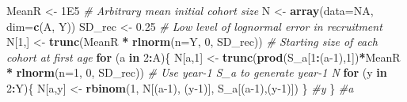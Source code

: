 \documentclass[
]{krantz}
\makeatletter
\newenvironment{Shaded}{\begin{snugshade}}{\end{snugshade}}
\newcommand{\AttributeTok}[1]{\textcolor[rgb]{0.27,0.27,0.27}{#1}}
\newcommand{\CommentTok}[1]{\textcolor[rgb]{0.37,0.37,0.37}{\textit{#1}}}
\newcommand{\ConstantTok}[1]{\textcolor[rgb]{0.37,0.37,0.37}{#1}}
\newcommand{\ControlFlowTok}[1]{\textcolor[rgb]{0.27,0.27,0.27}{\textbf{#1}}}
\newcommand{\DecValTok}[1]{\textcolor[rgb]{0.06,0.06,0.06}{#1}}
\newcommand{\FloatTok}[1]{\textcolor[rgb]{0.06,0.06,0.06}{#1}}
\newcommand{\FunctionTok}[1]{\textcolor[rgb]{0.27,0.27,0.27}{\textbf{#1}}}
\newcommand{\NormalTok}[1]{#1}
\newcommand{\OtherTok}[1]{\textcolor[rgb]{0.37,0.37,0.37}{#1}}
\newcommand{\SpecialCharTok}[1]{\textcolor[rgb]{0.43,0.43,0.43}{\textbf{#1}}}
\newenvironment{kframe}{%
\medskip{}
\setlength{\fboxsep}{.8em}
 \def\at@end@of@kframe{}%
 \ifinner\ifhmode%
  \def\at@end@of@kframe{\end{minipage}}%
  \begin{minipage}{\columnwidth}%
 \fi\fi%
 \def\FrameCommand##1{\hskip\@totalleftmargin \hskip-\fboxsep
 \colorbox{shadecolor}{##1}\hskip-\fboxsep
     \hskip-\linewidth \hskip-\@totalleftmargin \hskip\columnwidth}%
 \MakeFramed {\advance\hsize-\width
   \@totalleftmargin\z@ \linewidth\hsize
   \@setminipage}}%
 {\par\unskip\endMakeFramed%
 \at@end@of@kframe}
\renewenvironment{Shaded}{\begin{kframe}}{\end{kframe}}
\makeatother
\begin{document}
\begin{Shaded}
\begin{Highlighting}[]
\NormalTok{MeanR }\OtherTok{\textless{}{-}} \FloatTok{1E5} \CommentTok{\# Arbitrary mean initial cohort size}
\NormalTok{N }\OtherTok{\textless{}{-}} \FunctionTok{array}\NormalTok{(}\AttributeTok{data=}\ConstantTok{NA}\NormalTok{, }\AttributeTok{dim=}\FunctionTok{c}\NormalTok{(A, Y))}
\NormalTok{SD\_rec }\OtherTok{\textless{}{-}} \FloatTok{0.25} \CommentTok{\# Low level of lognormal error in recruitment}
\NormalTok{N[}\DecValTok{1}\NormalTok{,] }\OtherTok{\textless{}{-}} \FunctionTok{trunc}\NormalTok{(MeanR }\SpecialCharTok{*} \FunctionTok{rlnorm}\NormalTok{(}\AttributeTok{n=}\NormalTok{Y, }\DecValTok{0}\NormalTok{, SD\_rec)) }
\CommentTok{\# Starting size of each cohort at first age}
\ControlFlowTok{for}\NormalTok{ (a }\ControlFlowTok{in} \DecValTok{2}\SpecialCharTok{:}\NormalTok{A)\{}
\NormalTok{  N[a,}\DecValTok{1}\NormalTok{] }\OtherTok{\textless{}{-}} \FunctionTok{trunc}\NormalTok{(}\FunctionTok{prod}\NormalTok{(S\_a[}\DecValTok{1}\SpecialCharTok{:}\NormalTok{(a}\DecValTok{{-}1}\NormalTok{),}\DecValTok{1}\NormalTok{])}\SpecialCharTok{*}\NormalTok{MeanR }\SpecialCharTok{*} \FunctionTok{rlnorm}\NormalTok{(}\AttributeTok{n=}\DecValTok{1}\NormalTok{, }\DecValTok{0}\NormalTok{, SD\_rec))}
  \CommentTok{\# Use year{-}1 S\_a to generate year{-}1 N}
  \ControlFlowTok{for}\NormalTok{ (y }\ControlFlowTok{in} \DecValTok{2}\SpecialCharTok{:}\NormalTok{Y)\{}
\NormalTok{    N[a,y] }\OtherTok{\textless{}{-}} \FunctionTok{rbinom}\NormalTok{(}\DecValTok{1}\NormalTok{, N[(a}\DecValTok{{-}1}\NormalTok{), (y}\DecValTok{{-}1}\NormalTok{)], S\_a[(a}\DecValTok{{-}1}\NormalTok{),(y}\DecValTok{{-}1}\NormalTok{)])}
\NormalTok{  \} }\CommentTok{\#y}
\NormalTok{\} }\CommentTok{\#a}


\end{Highlighting}
\end{Shaded}
\end{document}
